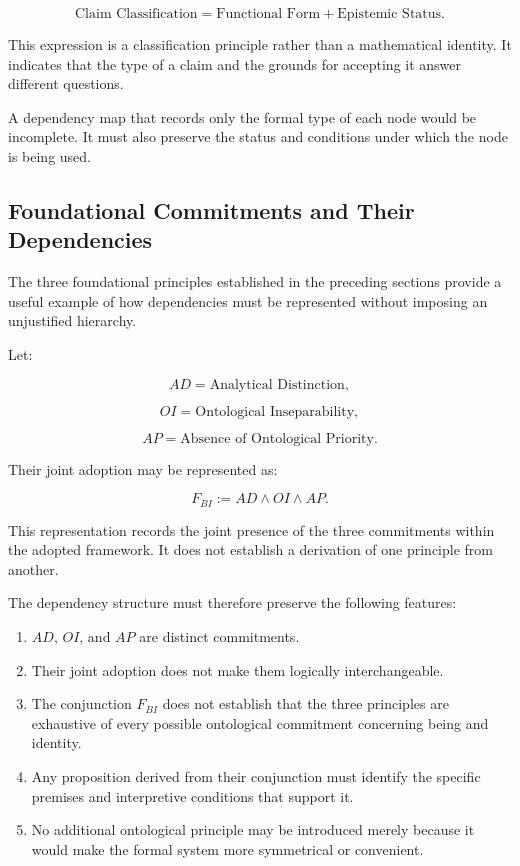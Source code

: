 \[
    \text{Claim Classification}
    =
    \text{Functional Form}
    +
    \text{Epistemic Status}.
\]

This expression is a classification principle rather than a
mathematical identity. It indicates that the type of a claim
and the grounds for accepting it answer different questions.

A dependency map that records only the formal type of each
node would be incomplete. It must also preserve the status
and conditions under which the node is being used.

\subsection{Foundational Commitments and Their Dependencies}

The three foundational principles established in the preceding
sections provide a useful example of how dependencies must
be represented without imposing an unjustified hierarchy.

Let:

\[
    AD = \text{Analytical Distinction},
\]

\[
    OI = \text{Ontological Inseparability},
\]

\[
    AP = \text{Absence of Ontological Priority}.
\]

Their joint adoption may be represented as:

\[
    F_{BI} := AD \land OI \land AP.
\]

This representation records the joint presence of the three
commitments within the adopted framework. It does not establish
a derivation of one principle from another.

The dependency structure must therefore preserve the following
features:

\begin{enumerate}
    \item \(AD\), \(OI\), and \(AP\) are distinct commitments.

    \item Their joint adoption does not make them logically
    interchangeable.

    \item The conjunction \(F_{BI}\) does not establish that
    the three principles are exhaustive of every possible
    ontological commitment concerning being and identity.

    \item Any proposition derived from their conjunction must
    identify the specific premises and interpretive conditions
    that support it.

    \item No additional ontological principle may be introduced
    merely because it would make the formal system more
    symmetrical or convenient.
\end{enumerate}


